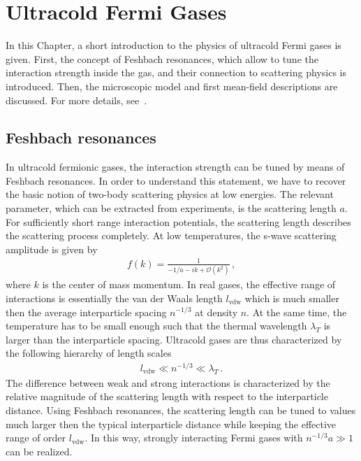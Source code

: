 \chapter{Ultracold Fermi Gases}
\label{chapter:ultracold-gases}

In this Chapter, a short introduction to the physics of ultracold Fermi gases is given. First, the concept of Feshbach resonances, which allow to tune the interaction strength inside the gas, and their connection to scattering physics is introduced. Then, the microscopic model and first mean-field descriptions are discussed. For more details, see~\cite{Boettcher2012,Randeria2014,Zwerger2016}.

\section{Feshbach resonances}
\label{section:feshbach-resonances}

In ultracold fermionic gases, the interaction strength can be tuned by means of Feshbach resonances. In order to understand this statement, we have to recover the basic notion of two-body scattering physics at low energies. The relevant parameter, which can be extracted from experiments, is the scattering length $a$. For sufficiently short range interaction potentials, the scattering length describes the scattering process completely. At low temperatures, the s-wave scattering amplitude is given by~\cite{Zwerger2016}
%
\begin{align}
	\label{eq:scattering-amplitude}
	f(k) = \frac{1}{-1/a-ik+\mathcal{O}(k^2)} \,,
\end{align}
%
where $k$ is the center of mass momentum. In real gases, the effective range of interactions is essentially the van der Waals length $l_{\mathrm{vdw}}$ which is much smaller then the average interparticle spacing $n^{-1/3}$ at density $n$. At the same time, the temperature has to be small enough such that the thermal wavelength $\lambda_T$ is larger than the interparticle spacing. Ultracold gases are thus characterized by the following hierarchy of length scales~\cite{Zwerger2016}
%
\begin{align}
	\label{eq:hierarchy-of-scales}
	l_{\mathrm{vdw}} \ll n^{-1/3} \ll \lambda_T \,.
\end{align}
%
The difference between weak and strong interactions is characterized by the relative magnitude of the scattering length with respect to the interparticle distance. Using Feshbach resonances, the scattering length can be tuned to values much larger then the typical interparticle distance while keeping the effective range of order $l_{\mathrm{vdw}}$. In this way, strongly interacting Fermi gases with $n^{-1/3}a\gg 1$ can be realized.

